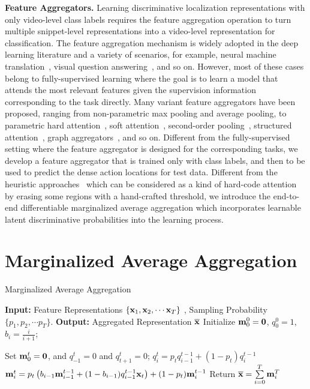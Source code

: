 \documentclass{article} \usepackage{iclr2019_conference,times}
\begin{document}
\textbf{Feature Aggregators.}
Learning discriminative localization representations with only video-level class labels requires the feature aggregation operation to turn multiple snippet-level representations into a video-level representation for classification. The feature aggregation mechanism is widely adopted in the deep learning literature and a variety of scenarios, for example, neural machine translation~\citep{machinetrans}, visual question answering~\citep{hermann2015teaching}, and so on. However, most of these cases belong to fully-supervised learning where the goal is to learn a model that attends the most relevant features given the supervision information corresponding to the task directly. Many variant feature aggregators have been proposed, ranging from non-parametric max pooling and average pooling, to parametric hard attention~\citep{gkioxari2015contextual}, soft attention~\citep{attention, sharma2015action}, second-order pooling~\citep{girdhar2017attentional, kong2017low}, structured attention~\citep{kim2017structured, mensch2018differentiableDP}, graph aggregators~\citep{zhang2018gaan, hamilton2017inductive}, and so on. Different from the fully-supervised setting where the feature aggregator is designed for the corresponding tasks, we develop a feature aggregator that is trained only with class labels, and then to be used to predict the dense action locations for test data. Different from the heuristic approaches~\citep{wei2017object, zhang2018adversarial} which can be considered as a kind of hard-code attention by erasing some regions with a hand-crafted threshold, we introduce the end-to-end differentiable marginalized average aggregation which incorporates learnable latent discriminative probabilities into the learning process.


\section{Marginalized Average Aggregation}\label{maa_algo}

\begin{algorithm}[h]
   \caption{Marginalized Average Aggregation}
   \label{MDA}
\begin{algorithmic}
   \STATE \textbf{Input:} Feature Representations  $\{{\bf{x}}_1,{\bf{x}}_2,\cdots{\bf{x}}_T \}$ , Sampling Probability $\{p_1,p_2,\cdots p_T\}$.
   \STATE \textbf{Output:} Aggregated Representation $\bf{\overline{x}}$
   \STATE Initialize ${\bf m}_0^0 = \bf{0}$, $q^0_0=1$, $b_i= \frac{i}{i+1}$;
   
   \STATE Set  ${\bf{m}}_0^t = \bf{0}$, and     $q_{-1}^t=0$ and $q_{t+1}^t=0$;
   \STATE $q_i^{t} = {p_{t }}q_{i - 1}^{t-1} + \left( {1 - {p_{t }}} \right)q_i^{t-1}$
   \STATE ${\bf{m}}_i^{t } = {p_{t }}\left( {{b_{i - 1}}{\bf{m}}_{i - 1}^{t-1} + (1 - {b_{i - 1}})q_{i - 1}^{t-1}{{\bf{x}}_{t }}} \right) + (1 - {p_{t }}){\bf{m}}_i^{t-1}$     
   \ENDFOR
   \ENDFOR
   \STATE Return $\overline{\bf{x}} = \sum\limits_{i = 0}^{T}  {{\bf{m}}_i^T} $
\end{algorithmic}

\end{algorithm}
\end{document}
